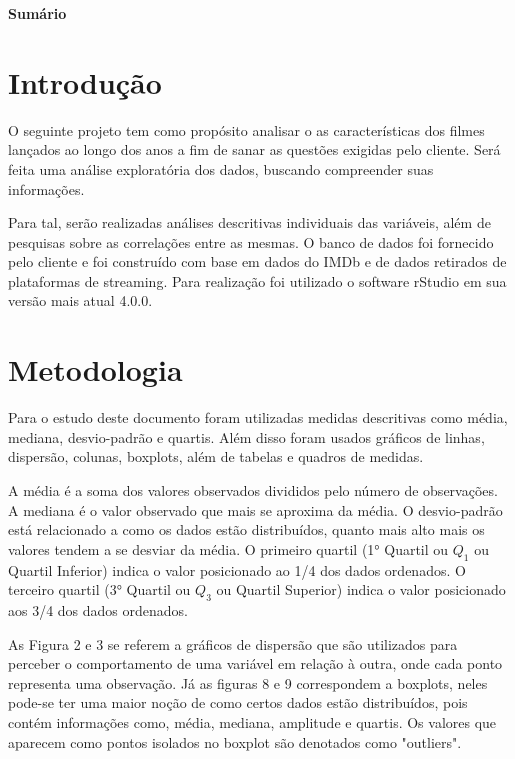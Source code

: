 \documentclass[a4paper, 12pt]{article} %
\makeatletter
\renewcommand\tableofcontents{
  \null\hfill\textbf{\Large\contentsname}\hfill\null\par
  \@mkboth{\MakeUppercase\contentsname}{\MakeUppercase\contentsname}%
  \@starttoc{toc}}
\renewcommand{\contentsname}{Sumário}
\makeatother
\begin{document}
\tableofcontents
\thispagestyle{empty}
\newpage







\section{Introdução}

O seguinte projeto tem como propósito analisar o as características dos filmes lançados ao longo dos anos a fim de sanar as questões exigidas pelo cliente. Será feita uma análise exploratória dos dados, buscando compreender suas informações.



Para tal, serão realizadas análises descritivas individuais das variáveis, além de pesquisas sobre as correlações entre as mesmas. O banco de dados foi fornecido pelo cliente e foi construído com base em dados do IMDb e de dados retirados de plataformas de streaming. Para realização foi utilizado o software rStudio em sua versão mais atual 4.0.0.

\newpage
\section{Metodologia}



Para o estudo deste documento foram utilizadas medidas descritivas como média, mediana, desvio-padrão e quartis. Além disso foram usados gráficos de linhas, dispersão, colunas, boxplots, além de tabelas e quadros de medidas.

A média é a soma dos valores observados divididos pelo número de observações. A mediana é o valor observado que mais se aproxima da média. O desvio-padrão está relacionado a como os dados estão distribuídos, quanto mais alto mais os valores tendem a se desviar da média. O primeiro quartil (1° Quartil ou $Q_1$ ou Quartil Inferior) indica o valor posicionado ao 1/4 dos dados ordenados. O terceiro quartil (3° Quartil ou $Q_3$ ou Quartil Superior) indica o valor posicionado aos 3/4 dos dados ordenados.

As Figura 2 e 3 se referem a gráficos de dispersão que são utilizados para perceber o comportamento de uma variável em relação à outra, onde cada ponto representa uma observação. Já as figuras 8 e 9 correspondem a boxplots, neles pode-se ter uma maior noção de como certos dados estão distribuídos, pois contém informações como, média, mediana, amplitude e quartis. Os valores que aparecem como pontos isolados no boxplot são denotados como "outliers".
\end{document}
